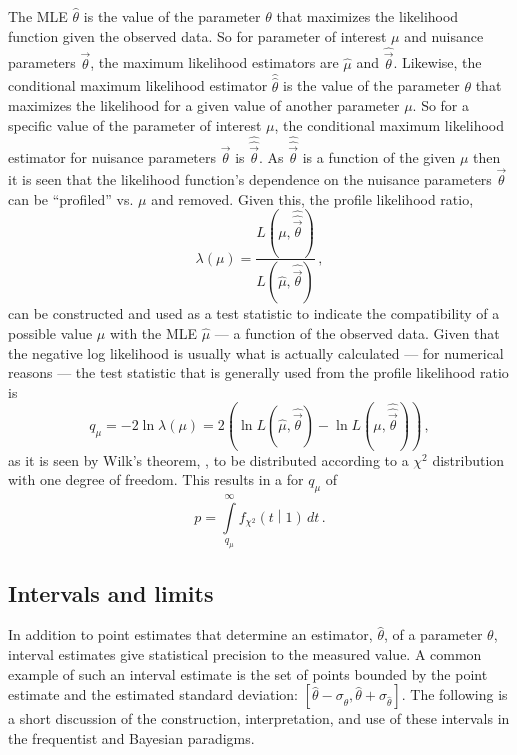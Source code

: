 The \gls{MLE} $\hat{\theta}$ is the value of the parameter $\theta$ that maximizes the likelihood function given the observed data.
So for parameter of interest $\mu$ and nuisance parameters $\vec{\theta}$, the maximum likelihood estimators are $\hat{\mu}$ and $\hat{\vec{\theta}}$.
Likewise, the conditional maximum likelihood estimator $\hat{\hat{\theta}}$ is the value of the parameter $\theta$ that maximizes the likelihood for a given value of another parameter $\mu$.
So for a specific value of the parameter of interest $\mu$, the conditional maximum likelihood estimator for nuisance parameters $\vec{\theta}$ is $\hat{\hat{\vec{\theta}}}$.
As $\hat{\hat{\vec{\theta}}}$ is a function of the given $\mu$ then it is seen that the likelihood function's dependence on the nuisance parameters $\vec{\theta}$ can be ``profiled'' vs. $\mu$ and removed.
Given this, the profile likelihood ratio,
\begin{equation}
 \lambda\left(\mu\right) = \frac{L\left(\mu, \hat{\hat{\vec{\theta}}}\right)}{L\left(\hat{\mu}, \hat{\vec{\theta}}\right)}\,,
 \label{eq:profile_likelihood_ratio}
\end{equation}
can be constructed and used as a test statistic to indicate the compatibility of a possible value $\mu$ with the MLE $\hat{\mu}$ --- a function of the observed data.
Given that the negative log likelihood is usually what is actually calculated --- for numerical reasons --- the test statistic that is generally used from the profile likelihood ratio is
\begin{equation}
 q_{\mu} = -2 \ln \lambda\left(\mu\right) = 2 \left(\ln L\left(\hat{\mu}, \hat{\vec{\theta}}\right) - \ln L\left(\mu, \hat{\hat{\vec{\theta}}}\right)\right)\,,
 \label{eq:q_mu}
\end{equation}
as it is seen by Wilk's theorem, , to be distributed according to a $\chi^{2}$ distribution with one degree of freedom.
This results in a \pvalue{} for $q_{\mu}$ of
\begin{equation}
 p = \int\limits_{q_{\mu}}^{\infty} f_{\chi^{2}}\left(t\middle|1\right)\,dt\,.
 \label{eq:q_mu_pvalue}
\end{equation}

\subsection{Intervals and limits}\label{section:intervals_and_limits}

In addition to point estimates that determine an estimator, $\hat{\theta}$, of a parameter $\theta$, interval estimates give statistical precision to the measured value.
A common example of such an interval estimate is the set of points bounded by the point estimate and the estimated standard deviation: $\left[\hat{\theta} - \sigma_{\hat{\theta}}, \hat{\theta} + \sigma_{\hat{\theta}}\right]$.
The following is a short discussion of the construction, interpretation, and use of these intervals in the frequentist and Bayesian paradigms.

